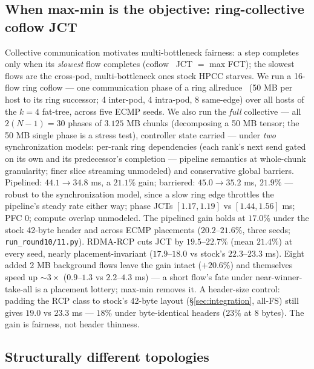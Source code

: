 \documentclass[sigconf, nonacm]{acmart}
\newcommand{\hpccfs}{\textsc{RDMA-RCP}\xspace}
\begin{document}
\subsection{When max-min is the objective: ring-collective coflow JCT}
\label{sec:jct}

Collective communication motivates multi-bottleneck fairness: a step completes only when
its \emph{slowest} flow completes (coflow~\cite{chowdhury2012coflow} JCT $=$ max FCT); the
slowest flows are the cross-pod, multi-bottleneck ones stock HPCC starves. We run a 16-flow ring coflow --- one
communication phase of a ring allreduce~\cite{patarasuk2009ring} (50 MB per host to its ring
successor; 4 inter-pod, 4 intra-pod, 8 same-edge) over all hosts of the $k{=}4$ fat-tree, across five ECMP seeds. We also run the \emph{full} collective --- all $2(N{-}1) = 30$ phases of $3.125$ MB
chunks (decomposing a 50 MB tensor; the 50 MB single phase is a stress test), controller
state carried --- under \emph{two} synchronization models: per-rank ring dependencies (each rank's next
send gated on its own and its predecessor's completion --- pipeline semantics at whole-chunk
granularity; finer slice streaming unmodeled) and conservative global barriers. Pipelined: $44.1 \to 34.8$ ms, a $21.1\%$
gain; barriered: $45.0 \to 35.2$ ms, $21.9\%$ --- robust to the synchronization model,
since a slow ring edge throttles the pipeline's steady rate either way; phase JCTs
$[1.17, 1.19]$ vs $[1.44, 1.56]$ ms; PFC 0; compute overlap unmodeled. The pipelined gain
holds at $17.0\%$ under the stock 42-byte header and across ECMP placements
($20.2$--$21.6\%$, three seeds; \texttt{run\_round10/11.py}). \hpccfs cuts JCT by $19.5$--$22.7\%$ (mean $21.4\%$) at every seed, nearly
placement-invariant ($17.9$--$18.0$ vs stock's $22.3$--$23.3$ ms). Eight added 2 MB background flows leave the gain intact ($+20.6\%$) and themselves speed up
${\sim}3\times$ ($0.9$--$1.3$ vs $2.2$--$4.3$ ms) --- a short flow's fate under
near-winner-take-all is a placement lottery; max-min removes it. A header-size control: padding the RCP class to stock's 42-byte layout
(\S\ref{sec:integration}, all-FS) still gives $19.0$ vs $23.3$ ms --- $18\%$ under
byte-identical headers ($23\%$ at 8 bytes). The gain is fairness, not header thinness.

\subsection{Structurally different topologies}
\end{document}
